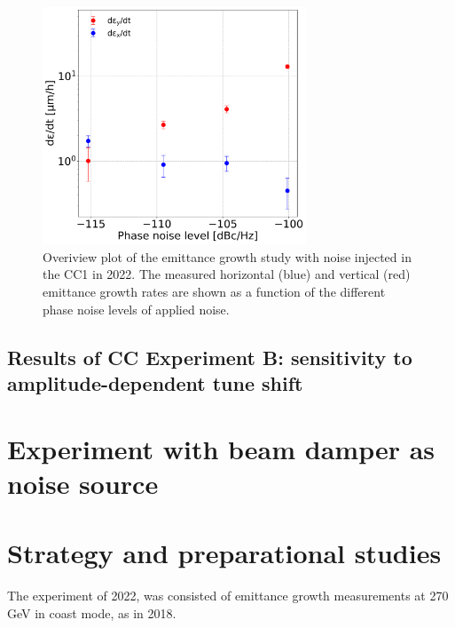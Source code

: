 \begin{figure}[!h] %
   \centering         
   \includegraphics[width=0.7\textwidth]{images/Ch8/emit_H_and_V_noise_scan.png}
       \caption{Overiview plot of the emittance growth study with noise injected in the CC1 in 2022. The measured horizontal (blue) and vertical (red) emittance growth rates are shown as a function of the different phase noise levels of applied noise.}
       \label{fig:H_V_emit_growth_noise_scan}
\end{figure}







\subsection{Results of CC Experiment B: sensitivity to amplitude-dependent tune shift} 

\section{Experiment with beam damper as noise source}



\newpage

\section{Strategy and preparational studies}\label{sec:strategy_md_2022}
The experiment of 2022, was consisted of emittance growth measurements at 270\,GeV in coast mode, as in 2018. 

